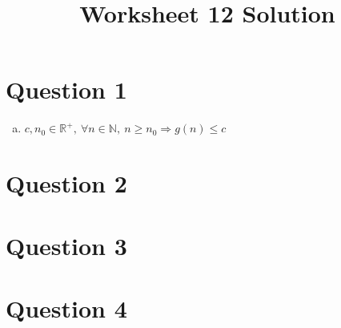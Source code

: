 \documentclass[12pt]{article}
\begin{document}
\title{Worksheet 12 Solution}
\maketitle

\section*{Question 1}
\begin{enumerate}[a.]
    \item

    $c,n_0 \in \mathbb{R}^{+},\:\forall n \in \mathbb{N},\: n \geq n_0 \Rightarrow
    g(n) \leq c$
\end{enumerate}


\section*{Question 2}

\section*{Question 3}

\section*{Question 4}
\end{document}
